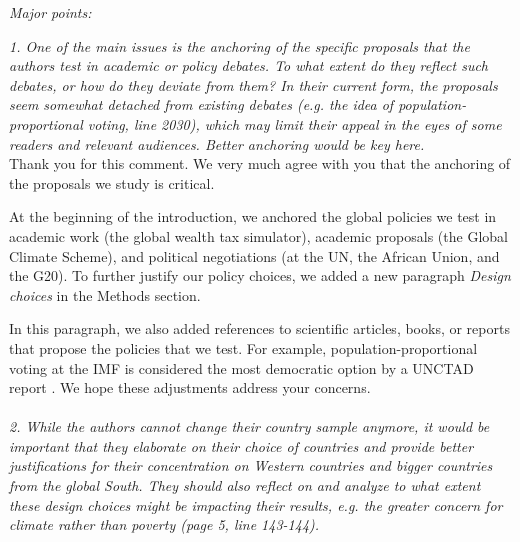 \documentclass[12pt,english]{article}
\begin{document}
\textit{Major points:}

\textit{1. One of the main issues is the anchoring of the specific proposals that the authors test in academic or policy debates. To what extent do they reflect such debates, or how do they deviate from them? In their current form, the proposals seem somewhat detached from existing debates (e.g. the idea of population-proportional voting, line 2030), which may limit their appeal in the eyes of some readers and relevant audiences. Better anchoring would be key here.}~\\

Thank you for this comment. We very much agree with you that the anchoring of the proposals we study is critical. 

At the beginning of the introduction, we anchored the global policies we test in academic work (the global wealth tax simulator), academic proposals (the Global Climate Scheme), and political negotiations (at the UN, the African Union, and the G20). To further justify our policy choices, we added a new paragraph \textit{Design choices} in the Methods section. 

In this paragraph, we also added references to scientific articles, books, or reports that propose the policies that we test. For example, population-proportional voting at the IMF is considered the most democratic option by a UNCTAD report \citep{woodward_imf_2007}. We hope these adjustments address your concerns.
~\\ ~\\


\textit{2. While the authors cannot change their country sample anymore, it would be important that they elaborate on their choice of countries and provide better justifications for their concentration on Western countries and bigger countries from the global South. They should also reflect on and analyze to what extent these design choices might be impacting their results, e.g. the greater concern for climate rather than poverty (page 5, line 143-144).}~\\
\end{document}
